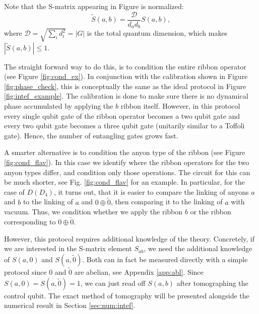 \documentclass[two column]{article}
\begin{document}
Note that the S-matrix appearing in Figure is normalized:
\begin{equation}
    \tilde{S}(a,b) = \frac{\mathcal D}{d_a d_b}S(a,b),
\end{equation}
where $\mathcal D=\sqrt{\sum_i d_i^2}=|G|$ is the total quantum dimension,
which makes $|\tilde{S}(a,b)| \leq 1$.



The straight forward way to do this, is to condition the entire ribbon operator (see Figure \ref{fig:cond_ex}).  In conjunction with the calibration shown in Figure \ref{fig:phase_check}, this is conceptually the same as the ideal protocol in Figure \ref{fig:intef_example}. 
The calibration is done to make sure there is no dynamical phase accumulated by applying the $b$ ribbon itself.
However, in this protocol every single qubit gate of the ribbon operator becomes a two qubit gate and every two qubit gate becomes a three qubit gate (unitarily similar to a Toffoli gate). Hence, the number of entangling gates grows fast.

A smarter alternative is to condition the anyon type of the ribbon (see Figure \ref{fig:cond_flav}). In this case we identify where the ribbon operators for the two anyon types differ, and condition only those operations. The circuit for this can be much shorter, see Fig. \ref{fig:cond_flav} for an example. In particular, for the case of $D(D_4)$, it turns out, that it is easier to compare the linking of anyons $a$ and $b$ to the linking of $a$ and $0 \oplus \tilde 0$, then comparing it to the linking of $a$ with vacuum. Thus, we condition whether we apply the ribbon $b$ or the ribbon corresponding to $0 \oplus \tilde 0$. 

However, this protocol requires additional knowledge of the theory. Concretely, if we are interested in the S-matrix element $S_{ab}$, we need the additional knowledge of  $S(a, 0)$ and $S(a, \tilde{0})$. Both can in fact be measured directly with a simple protocol since $0$ and $\tilde{0}$ are abelian, see Appendix \ref{app:abl}.
Since $S(a, 0) = S(a, \tilde{0}) = 1$, we can just read off $S(a,b)$ after tomographing the control qubit.
The exact method of tomography will be presented alongside the numerical result in Section \ref{sec:num:intef}. 
\end{document}
